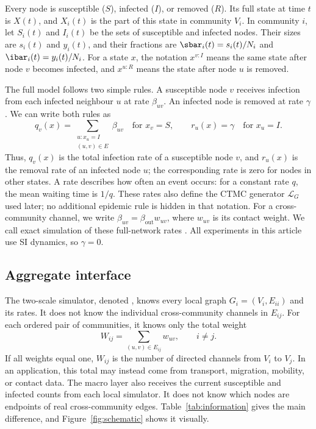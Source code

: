 Every node is susceptible ($S$), infected ($I$), or removed ($R$). Its full state at time $t$ is $X(t)$, and $X_i(t)$ is the part of this state in community $V_i$. In community $i$, let $S_i(t)$ and $I_i(t)$ be the sets of susceptible and infected nodes. Their sizes are $s_i(t)$ and $y_i(t)$, and their fractions are $\sbar_i(t)=s_i(t)/N_i$ and $\ibar_i(t)=y_i(t)/N_i$. For a state $x$, the notation $x^{v:I}$ means the same state after node $v$ becomes infected, and $x^{u:R}$ means the state after node $u$ is removed.

The full model follows two simple rules. A susceptible node $v$ receives infection from each infected neighbour $u$ at rate $\beta_{uv}$. An infected node is removed at rate $\gamma$. We can write both rules as
\begin{equation}
\label{eq:full_generator}
q_v(x)=\sum_{\substack{u:x_u=I\\(u,v)\in E}}\beta_{uv}
\quad\text{for }x_v=S,
\qquad
r_u(x)=\gamma
\quad\text{for }x_u=I.
\end{equation}
Thus, $q_v(x)$ is the total infection rate of a susceptible node $v$, and $r_u(x)$ is the removal rate of an infected node $u$; the corresponding rate is zero for nodes in other states. A rate describes how often an event occurs: for a constant rate $q$, the mean waiting time is $1/q$. These rates also define the CTMC generator $\mathcal{L}_G$ used later; no additional epidemic rule is hidden in that notation. For a cross-community channel, we write $\beta_{uv}=\beta_{\mathrm{out}}w_{uv}$, where $w_{uv}$ is its contact weight. We call exact simulation of these full-network rates \Full{}. All experiments in this article use SI dynamics, so $\gamma=0$.

\subsection{Aggregate interface}
\label{sec:interface}

The two-scale simulator, denoted \TS{}, knows every local graph $G_i=(V_i,E_{ii})$ and its rates. It does not know the individual cross-community channels in $E_{ij}$. For each ordered pair of communities, it knows only the total weight
\begin{equation}
\label{eq:weight}
W_{ij}=\sum_{(u,v)\in E_{ij}}w_{uv},
\qquad i\neq j.
\end{equation}
If all weights equal one, $W_{ij}$ is the number of directed channels from $V_i$ to $V_j$. In an application, this total may instead come from transport, migration, mobility, or contact data. The macro layer also receives the current susceptible and infected counts from each local simulator. It does not know which nodes are endpoints of real cross-community edges. Table~\ref{tab:information} gives the main difference, and Figure~\ref{fig:schematic} shows it visually.

